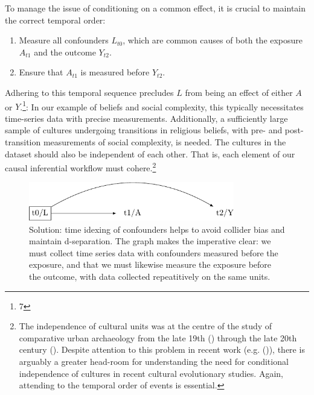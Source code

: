 \documentclass[
  singlecolumn,
  9pt]{article}
\providecommand{\tightlist}{%
  \setlength{\itemsep}{0pt}\setlength{\parskip}{0pt}}\usepackage{longtable,booktabs,array}
\begin{document}
To manage the issue of conditioning on a common effect, it is crucial to
maintain the correct temporal order:

\begin{enumerate}
\def\labelenumi{\arabic{enumi}.}
\tightlist
\item
  Measure all confounders \(L_{t0}\), which are common causes of both
  the exposure \(A_{t1}\) and the outcome \(Y_{t2}\).
\item
  Ensure that \(A_{t1}\) is measured before \(Y_{t2}\).
\end{enumerate}

Adhering to this temporal sequence precludes \(L\) from being an effect
of either \(A\) or \(Y\).\footnote{7}: In our example of beliefs and
social complexity, this typically necessitates time-series data with
precise measurements. Additionally, a sufficiently large sample of
cultures undergoing transitions in religious beliefs, with pre- and
post-transition measurements of social complexity, is needed. The
cultures in the dataset should also be independent of each other. That
is, each element of our causal inferential workflow must
cohere.\footnote{The independence of cultural units was at the centre of
  the study of comparative urban archaeology from the late 19th
  () through the late
  20th century (). Despite
  attention to this problem in recent work (e.g.
  ()), there is
  arguably a greater head-room for understanding the need for
  conditional independence of cultures in recent cultural evolutionary
  studies. Again, attending to the temporal order of events is
  essential.}

\begin{figure}

{\centering \includegraphics[width=0.8\textwidth,height=\textheight]{causal-dags_files/figure-pdf/fig-dag-common-effect-solution-1.pdf}

}

\caption{\label{fig-dag-common-effect-solution}Solution: time idexing of
confounders helps to avoid collider bias and maintain d-separation. The
graph makes the imperative clear: we must collect time series data with
confounders measured before the exposure, and that we must likewise
measure the exposure before the outcome, with data collected
repeatitively on the same units.}

\end{figure}
\end{document}
